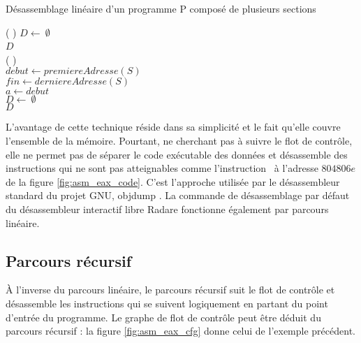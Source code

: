 \begin{algorithm}[H]
\caption{Désassemblage linéaire d'un programme P composé de plusieurs sections}
\SetAlgoLined
{}
\Fn(
){}{
$D \leftarrow\ \emptyset$\\
\Return $D$
}
~\\
\Fn(
){}{
  \\
  $debut \leftarrow premiereAdresse(S)$  \\
  $fin \leftarrow derniereAdresse(S)$    \\
  $a \leftarrow debut$ \\
  $D \leftarrow\ \emptyset$\\
  \Return $D$
}
\label{algo:parcours_lineaire}
\end{algorithm}

L'avantage de cette technique réside dans sa simplicité et le fait qu'elle couvre l'ensemble de la mémoire.
Pourtant, ne cherchant pas à suivre le flot de contrôle, elle ne permet pas de séparer le code exécutable des données et désassemble des instructions qui ne sont pas atteignables comme l'instruction \mov\ à l'adresse $804806e$ de la figure \ref{fig:asm_eax_code}.
C'est l'approche utilisée par le désassembleur standard du projet GNU, objdump \cite{objdump}.
La commande de désassemblage par défaut du désassembleur interactif libre Radare \cite{radare} fonctionne également par parcours linéaire.



\subsection{Parcours récursif}
À l'inverse du parcours linéaire, le parcours récursif suit le flot de contrôle et désassemble les instructions qui se suivent logiquement en partant du point d'entrée du programme. Le graphe de flot de contrôle peut être déduit du parcours récursif : la figure \ref{fig:asm_eax_cfg} donne celui de l'exemple précédent.


